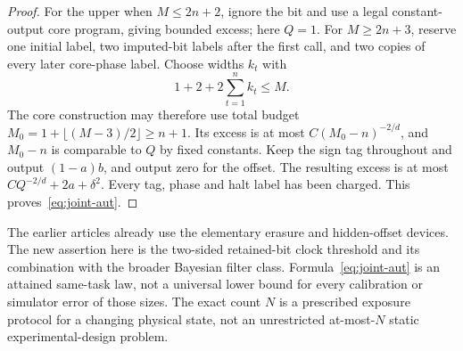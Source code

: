 \begin{proof}
For the upper when $M\le2n+2$, ignore the bit and use a legal constant-output core program, giving bounded excess; here $Q=1$. For $M\ge2n+3$, reserve one initial label, two imputed-bit labels after the first call, and two copies of every later core-phase label. Choose widths $k_t$ with
\[
 1+2+2\sum_{t=1}^nk_t\le M.
\]
The core construction may therefore use total budget
$M_0=1+\lfloor(M-3)/2\rfloor\ge n+1$. Its excess is at most $C(M_0-n)^{-2/d}$, and $M_0-n$ is comparable to $Q$ by fixed constants. Keep the sign tag throughout and output $(1-a)b$, and output zero for the offset. The resulting excess is at most $CQ^{-2/d}+2a+\delta^2$. Every tag, phase and halt label has been charged. This proves~\eqref{eq:joint-aut}.
\end{proof}
The earlier articles already use the elementary erasure and hidden-offset devices. The new assertion here is the two-sided retained-bit clock threshold and its combination with the broader Bayesian filter class. Formula~\eqref{eq:joint-aut} is an attained same-task law, not a universal lower bound for every calibration or simulator error of those sizes. The exact count $N$ is a prescribed exposure protocol for a changing physical state, not an unrestricted at-most-$N$ static experimental-design problem.
